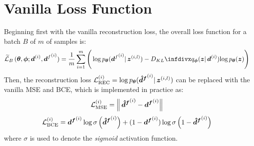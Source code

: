 \section{Vanilla Loss Function}
\label{sec:8_vanilla}
Beginning first with the vanilla reconstruction loss, the overall loss function for a batch $B$ of $m$ of samples is: 
\begin{equation}
    \widetilde{\loss}_B\,(\boldsymbol{\theta}, \boldsymbol{\phi}; \d^{(i)}, {\d^f}^{(i)} ) =
    \frac{1}{m} \sum_{i=1}^m
    \Bigg(
    \log \pbt ({\d^f}^{(i)} |\, \bz^{(i,l)}) 
    -
    \DKL{\qbp(\bz |\, \d^{(i)})}{\log \pbt(\bz)}
    \Bigg)
    \label{eq:8_vanilla_loss_estimator_batch}
\end{equation}
Then, the reconstruction loss $\mathcal{L}^{(i)}_{\text{REC}} = \log p_{\boldsymbol{\theta}} (\boldsymbol{\hat{d}^f}^{(i)} |\, \boldsymbol{z}^{(i,l)})$ can be replaced with the vanilla MSE and BCE, which is implemented in practice as:
\begin{equation}
    \mathcal{L}^{(i)}_{\text{MSE}} = \left\lVert\, \boldsymbol{\hat{d}^f}^{(i)} - \boldsymbol{d^f}^{(i)}\right\rVert
    \label{eq:8_mse_vanilla_loss}
\end{equation}
\begin{equation}
    \mathcal{L}^{(i)}_{\text{BCE}} =\boldsymbol{d^f}^{(i)} \log \sigma\left(\boldsymbol{\hat{d}^f}^{(i)}\right) +  (1 - \boldsymbol{d^f}^{(i)}) \log \sigma\left(1 - \boldsymbol{\hat{d}^f}^{(i)}\right)
    \label{eq:8_bce_vanilla_loss}
\end{equation}
where $\sigma$ is used to denote the \textit{sigmoid} activation function.

